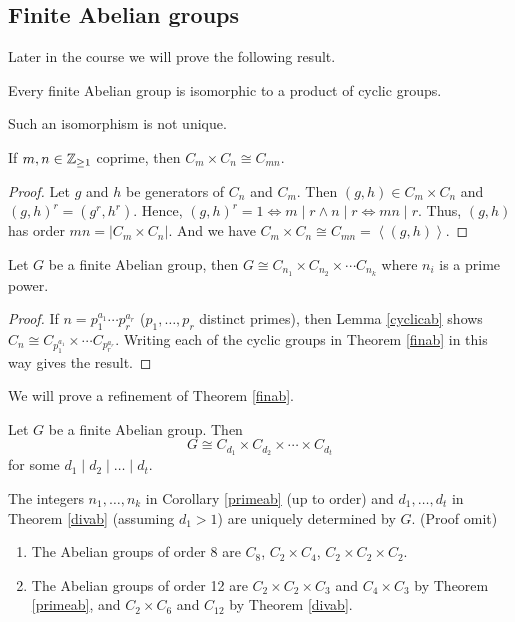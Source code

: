 \subsection{Finite Abelian groups}
Later in the course we will prove the following result.
\begin{theorem}
    Every finite Abelian group is isomorphic to a product of cyclic groups.
    \label{finab}
\end{theorem}
\begin{note}
    Such an isomorphism is not unique.
\end{note}
\begin{lemma}
    If \(m, n \in \mathbb{\MakeUppercase{Z}}_{\geq 1}\) coprime, then \(C_m \times C_n \cong C_{mn}\).
    \label{cyclicmn}
\end{lemma}
\begin{proof}
    Let \(g\) and \(h\) be generators of \(C_n\) and \(C_m\). Then \((g, h) \in C_m \times C_n\) and \((g, h)^r = (g^r, h^r)\). Hence, \((g, h)^r = 1 \iff m \mid r \land n \mid r \iff mn \mid r\). Thus, \((g,h)\) has order \(mn = \left\vert C_m \times C_n \right\vert \). And we have \( C_m \times C_n \cong C_{mn} = \left\langle(g,h)\right\rangle \).
\end{proof}
\begin{corollary}
    Let \(G\) be a finite Abelian group, then \(G \cong C_{n_1} \times C_{n_2} \times \cdots C_{n_k}\) where \(n_i\) is a prime power.
    \label{primeab}
\end{corollary}
\begin{proof}
    If \(n = p_1^{a_1}\cdots p_r^{a_r}\) (\(p_1,\ldots,p_r\) distinct primes), then Lemma \eqref{cyclicab} shows \(C_n \cong C_{p_1^{a_1}}\times \cdots C_{p_r^{a_r}}\). Writing each of the cyclic groups in Theorem \eqref{finab} in this way gives the result.
\end{proof}
We will prove a refinement of Theorem \eqref{finab}.
\begin{theorem}
    \label{divab}
    Let \(G\) be a finite Abelian group. Then
    \[G \cong C_{d_1}\times C_{d_2} \times \cdots \times C_{d_t}\]
    for some \(d_1 \mid d_2 \mid \dots \mid d_t\).
\end{theorem}
\begin{remark}
    The integers \(n_1, \ldots, n_k\) in Corollary \eqref{primeab} (up to order) and \(d_1, \ldots, d_t\) in Theorem \eqref{divab} (assuming \(d_1 > 1\)) are uniquely determined by \(G\). (Proof omit)
\end{remark}
\begin{example}
    \leavevmode
    \begin{enumerate}
        \item The Abelian groups of order 8 are \(C_8\), \(C_2 \times C_4\), \(C_2 \times C_2 \times C_2\).
        \item The Abelian groups of order 12 are \(C_2 \times C_2 \times C_3\) and \(C_4 \times C_3\) by Theorem \eqref{primeab}, and \(C_2 \times C_6\) and \(C_{12}\) by Theorem \eqref{divab}.
    \end{enumerate}
\end{example}
